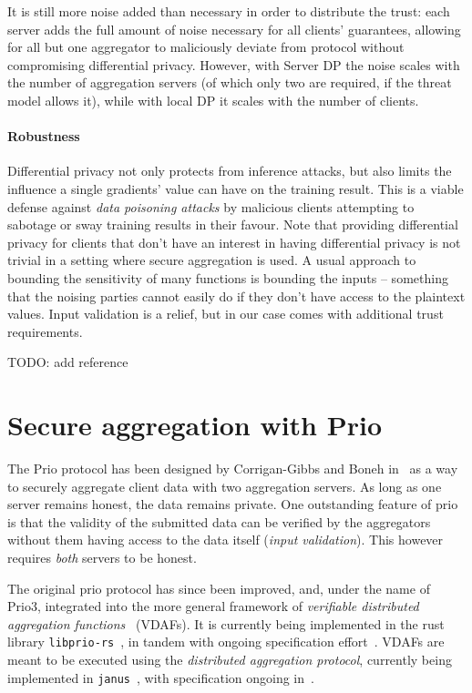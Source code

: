 \documentclass{article}
\begin{document}
It is still more noise added than necessary in order to distribute the trust:
each server adds the full amount of noise necessary for all clients' guarantees,
allowing for all but one aggregator to maliciously deviate from protocol without
compromising differential privacy. However, with Server DP the noise scales with the number of
aggregation servers (of which only two are required, if the threat model allows it), while
with local DP it scales with the number of clients.

\paragraph{Robustness}

Differential privacy not only protects from inference attacks, but also limits the influence a single gradients' value can have on the training result. This is a viable defense against \textit{data poisoning attacks} by malicious clients attempting to sabotage or sway training results in their favour. Note that providing differential privacy for clients that don't have an interest in having differential privacy is not trivial in a setting where secure aggregation is used. A usual approach to bounding the sensitivity of many functions is bounding the inputs -- something that the noising parties cannot easily do if they don't have access to the plaintext values. Input validation is a relief, but in our case comes with additional trust requirements.

{\color{red}TODO: add reference}



\section{Secure aggregation with Prio}
The Prio protocol has been designed by Corrigan-Gibbs and Boneh in~\cite{prio} as a
way to securely aggregate client data with two aggregation servers. As long as
one server remains honest, the data remains private. One outstanding feature of
prio is that the validity of the submitted data can be verified by the
aggregators without them having access to the data itself (\textit{input
  validation}). This however requires \emph{both} servers to be honest.

The original prio protocol has since been improved, and, under the name of Prio3, integrated into the
more general framework of \textit{verifiable distributed aggregation
  functions}~\cite{vdaf} (VDAFs). It is currently being implemented in the rust library
\texttt{libprio-rs}~\cite{libprio-rs}, in tandem with ongoing specification effort~\cite{vdaf-draft}.
VDAFs are meant to be executed using the \textit{distributed aggregation
  protocol}, currently being implemented in \texttt{janus}~\cite{janus}, with
specification ongoing in~\cite{dap-draft}.
\end{document}
